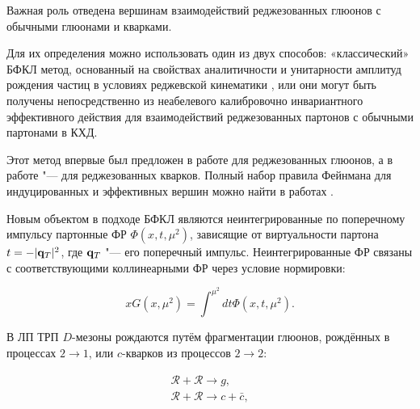 Важная роль отведена вершинам взаимодействий реджезованных глюонов с обычными глюонами и кварками. 

Для их определения можно использовать один из двух способов: «классический» БФКЛ метод, основанный на свойствах аналитичности и унитарности амплитуд рождения частиц в условиях реджевской кинематики \cite{FadinFiore}, или они могут быть получены непосредственно из неабелевого калибровочно инвариантного эффективного действия для взаимодействий реджезованных партонов с обычными партонами в КХД.



Этот метод впервые был предложен в работе \cite{KTLipatov} для реджезованных глюонов, а в работе \cite{LipVyaz} "--- для реджезованных кварков. Полный набор правила Фейнмана для индуцированных и эффективных вершин можно найти в работах \cite{LipVyaz,KTAntonov}.



Новым объектом в подходе БФКЛ являются неинтегрированные по поперечному импульсу партонные ФР $\Phi(x,t,\mu^2)$, зависящие от виртуальности партона $t=-|{\bf q}_T|^2$, где ${\bf q}_T$ "--- его поперечный импульс. Неинтегрированные ФР связаны с соответствующими коллинеарными ФР через условие нормировки:

\begin{equation}

xG(x,\mu^2)=\int^{\mu^2}dt \Phi(x,t,\mu^2).

\end{equation}



В ЛП ТРП $D$-мезоны рождаются путём фрагментации глюонов, рождённых в процессах $2\to1$, или $c$-кварков из процессов $2\to2$:

\begin{gather}

\mathcal {R} + \mathcal {R} \to g, \phantom{+ \bar c} \label{eq:RRg}\\

\mathcal {R} + \mathcal {R} \to c + \bar c, \label{eq:RRQQ}

\end{gather}

